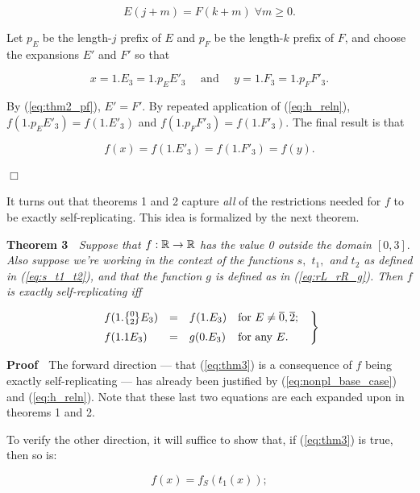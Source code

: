 \documentclass[20pt,]{extarticle}
\newcommand{\latexonlyrule}{\rule}
\begin{document}
\begin{equation}E(j+m)=F(k+m)\; \forall m\ge 0.\label{eq:thm2_pf}\end{equation}

Let \(p_E\) be the length-\(j\) prefix of \(E\) and \(p_F\) be the
length-\(k\) prefix of \(F\), and choose the expansions \(E'\) and
\(F'\) so that

\[x = 1.E_3 = 1.p_EE'_3 \quad\text{ and }\quad y = 1.F_3 = 1.p_FF'_3.\]

By (\ref{eq:thm2_pf}), \(E'=F'\). By repeated application of
(\ref{eq:h_reln}), \(f(1.p_EE'_3) = f(1.E'_3)\) and
\(f(1.p_FF'_3) = f(1.F'_3)\). The final result is that

\[f(x) = f(1.E'_3) = f(1.F'_3) = f(y).\]

\hfill\(\Box\)

It turns out that theorems 1 and 2 capture \emph{all} of the
restrictions needed for \(f\) to be exactly self-replicating. This idea
is formalized by the next theorem.

\textbf{Theorem 3} \(\;\) \emph{Suppose that \(f:\mathbb{R}\to\mathbb{R}\) has the value
0 outside the domain \([0, 3].\) Also suppose we're working in the
context of the functions \(s,\) \(t_1,\) and \(t_2\) as defined in
(\ref{eq:s_t1_t2}), and that the function \(g\) is defined as in
(\ref{eq:rL_rR_g}). Then \(f\) is exactly self-replicating iff}

\begin{equation}\eqnset{\begin{array}{lcll}
f(1.\zerotwo E_3) & = & f(1.E_3) & \text{for } E\ne\overline 0,\overline 2; \\
f(1.1E_3)         & = & g(0.E_3) & \text{for any }E. \latexonlyrule{0pt}{14pt} \\
\end{array}}\label{eq:thm3}\end{equation}

\textbf{Proof} \(\;\) The forward direction --- that (\ref{eq:thm3}) is
a consequence of \(f\) being exactly self-replicating --- has already
been justified by (\ref{eq:nonpl_base_case}) and (\ref{eq:h_reln}). Note
that these last two equations are each expanded upon in theorems 1 and
2.

To verify the other direction, it will suffice to show that, if
(\ref{eq:thm3}) is true, then so is:

\begin{equation}f(x) = f_S(t_1(x));\label{eq:thm3_pf}\end{equation}
\end{document}
